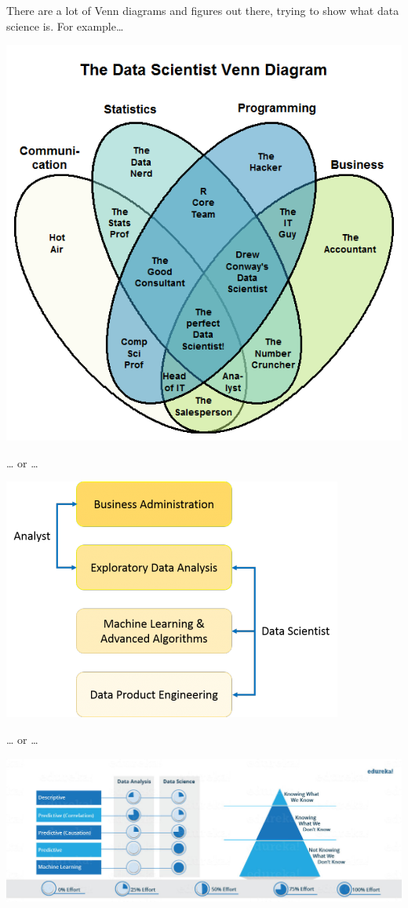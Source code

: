 \documentclass[
]{book}
\begin{document}
There are a lot of Venn diagrams and figures out there, trying to show what data science is. For example\ldots{}

\includegraphics{img/venn1.png}

\ldots{} or \ldots{}

\includegraphics{img/venn2.png}

\ldots{} or \ldots{}

\includegraphics{img/venn3.jpg}
\end{document}
